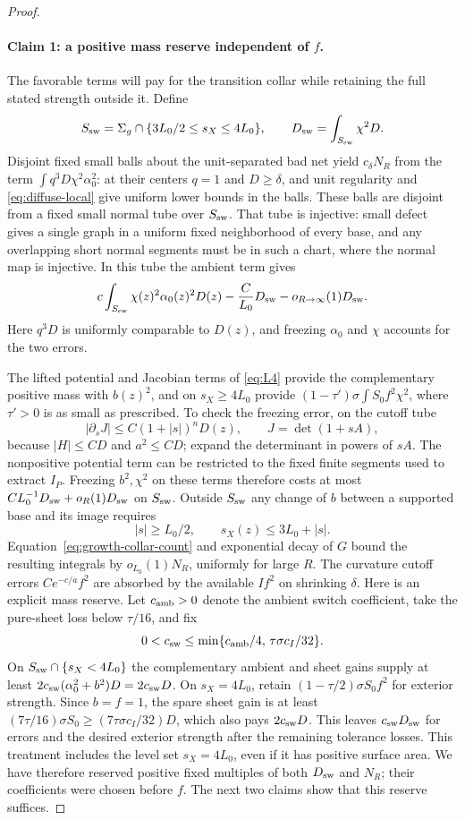 \begin{proof}
\paragraph{Claim 1: a positive mass reserve independent of $f$.}
The favorable terms will pay for the transition collar while retaining
the full stated strength outside it.  Define
\[
 S_{\rm sw}=\Sigma_g\cap\{3L_0/2\le s_X\le4L_0\},\qquad
 D_{\rm sw}=\int_{S_{\rm sw}}\chi^2D.
\]
Disjoint fixed small balls about the unit-separated bad net yield
$c_\delta N_R$ from the term
$\int q^3D\chi^2\alpha_0^2$: at their centers $q=1$ and $D\ge\delta$,
and unit regularity and \eqref{eq:diffuse-local} give uniform lower
bounds in the balls.  These balls are disjoint from a fixed small
normal tube over $S_{\rm sw}$.  That tube is injective: small defect
gives a single graph in a uniform fixed neighborhood of every base,
and any overlapping short normal segments must be in such a chart,
where the normal map is injective.  In this tube the ambient term gives
\[
 c\int_{S_{\rm sw}}\chi(z)^2\alpha_0(z)^2D(z)
       -\frac C{L_0}D_{\rm sw}-o_{R\to\infty}(1)D_{\rm sw}.
\]
Here $q^3D$ is uniformly comparable to $D(z)$, and freezing $\alpha_0$
and $\chi$ accounts for the two errors.

The lifted potential and Jacobian terms of \eqref{eq:L4} provide the
complementary positive mass with $b(z)^2$, and on $s_X\ge4L_0$ provide
$(1-\tau')\sigma\int S_0f^2\chi^2$, where $\tau'>0$ is as small as
prescribed.  To check the freezing error, on the cutoff tube
\[
 |\partial_sJ|\le C(1+|s|)^nD(z),\qquad J=\det(1+sA),
\]
because $|H|\le CD$ and $a^2\le CD$; expand the determinant in powers
of $sA$.  The nonpositive potential term can be restricted to the
fixed finite segments used to extract $I_P$.  Freezing $b^2,\chi^2$ on
these terms therefore costs at most
$C L_0^{-1}D_{\rm sw}+o_R(1)D_{\rm sw}$ on $S_{\rm sw}$.
Outside $S_{\rm sw}$ any change of $b$ between a supported base and its
image requires
\[
 |s|\ge L_0/2,\qquad s_X(z)\le3L_0+|s|.
\]
Equation~\eqref{eq:growth-collar-count} and exponential decay of $G$
bound the resulting integrals by $o_{L_0}(1)N_R$, uniformly for large
$R$.  The curvature cutoff errors $Ce^{-c/a}f^2$ are absorbed by the
available $I f^2$ on shrinking $\delta$.  Here is an explicit mass
reserve.  Let $c_{\rm amb}>0$ denote the ambient switch coefficient,
take the pure-sheet loss below $\tau/16$, and fix
\[
 0<c_{\rm sw}\le
 \min\{c_{\rm amb}/4,\,\tau\sigma c_I/32\}.
\]
On $S_{\rm sw}\cap\{s_X<4L_0\}$ the complementary ambient and sheet
gains supply at least $2c_{\rm sw}(\alpha_0^2+b^2)D=2c_{\rm sw}D$.
On $s_X=4L_0$, retain $(1-\tau/2)\sigma S_0f^2$ for exterior strength.
Since $b=f=1$, the spare sheet gain is at least
$(7\tau/16)\sigma S_0\ge(7\tau\sigma c_I/32)D$, which also pays
$2c_{\rm sw}D$.  This leaves $c_{\rm sw}D_{\rm sw}$ for errors and
the desired exterior strength after the remaining tolerance losses.
This treatment includes the level set $s_X=4L_0$, even if it has
positive surface area.  We have therefore reserved positive fixed
multiples of both $D_{\rm sw}$ and $N_R$; their coefficients were
chosen before $f$.  The next two claims show that this reserve suffices.


\end{proof}

